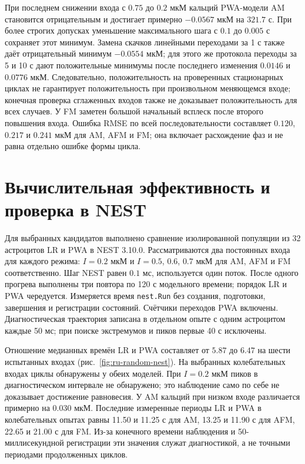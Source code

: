 При последнем снижении входа с $0.75$ до $0.2$ мкМ кальций PWA-модели AM становится отрицательным и достигает примерно $-0.0567$ мкМ на $321.7$ с. При более строгих допусках уменьшение максимального шага с $0.1$ до $0.005$ с сохраняет этот минимум. Замена скачков линейными переходами за 1 с также даёт отрицательный минимум $-0.0554$ мкМ; для этого же протокола переходы за 5 и 10 с дают положительные минимумы после последнего изменения $0.0146$ и $0.0776$ мкМ. Следовательно, положительность на проверенных стационарных циклах не гарантирует положительность при произвольном меняющемся входе; конечная проверка сглаженных входов также не доказывает положительность для всех случаев. У FM заметен большой начальный всплеск после второго повышения входа. Ошибка RMSE по всей последовательности составляет $0.120$, $0.217$ и $0.241$ мкМ для AM, AFM и FM; она включает расхождение фаз и не равна отдельно ошибке формы цикла.

\section{Вычислительная эффективность и проверка в NEST}
Для выбранных кандидатов выполнено сравнение изолированной популяции из 32 астроцитов LR и PWA в NEST 3.10.0. Рассматриваются два постоянных входа для каждого режима: $I=0.2$ мкМ и $I=0.5$, $0.6$, $0.7$ мкМ для AM, AFM и FM соответственно. Шаг NEST равен $0.1$ мс, используется один поток. После одного прогрева выполнены три повтора по 120 с модельного времени; порядок LR и PWA чередуется. Измеряется время \texttt{nest.Run} без создания, подготовки, завершения и регистрации состояний. Счётчики переходов PWA включены. Диагностическая траектория записана в отдельном опыте с одним астроцитом каждые 50 мс; при поиске экстремумов и пиков первые 40 с исключены.

Отношение медианных времён LR и PWA составляет от $5.87$ до $6.47$ на шести испытанных входах (рис.~\ref{fig:ru-random-nest}). На выбранных колебательных входах циклы обнаружены у обеих моделей. При $I=0.2$ мкМ пиков в диагностическом интервале не обнаружено; это наблюдение само по себе не доказывает достижение равновесия. У AM кальций при низком входе различается примерно на $0.030$ мкМ. Последние измеренные периоды LR и PWA в колебательных опытах равны 11.50 и 11.25 с для AM, 13.25 и 11.90 с для AFM, 22.65 и 21.00 с для FM. Из-за конечного времени наблюдения и 50-миллисекундной регистрации эти значения служат диагностикой, а не точными периодами продолженных циклов.


